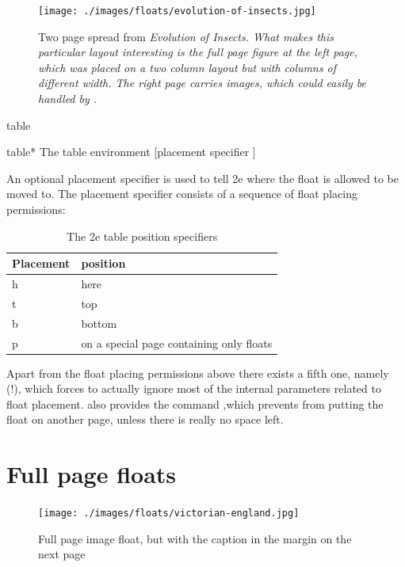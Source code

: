 \begin{figure}[hb]
\texttt{[image: ./images/floats/evolution-of-insects.jpg]}
\caption{Two page spread from \textit{Evolution of Insects. What makes this particular layout interesting is the full page figure at the left page, which was placed on a two column layout but with columns of different width. The right page carries images, which could easily be handled by \latexe.   }}
\end{figure}

\begin{environment}{table}
\begin{environment}{table*}
 The table environment 
[placement specifier ]
\end{environment}
\end{environment}

An optional placement specifier is used to tell \latex2e where the float is allowed to be
moved to. The placement specifier consists of a sequence of float placing permissions:

\begin{table}[htbp]
\centering
\begin{tabular}{lp{3.5cm}}
\toprule
Placement   & position\\
\midrule
h                 & here\\
t                  & top\\
b                 & bottom\\
p                 & on a special page containing only floats\\
\bottomrule
\end{tabular}

\caption{The \latex2e table position specifiers}
\end{table}




Apart from the float placing permissions above there exists a fifth one, namely (!), which
forces \latex to actually ignore most of the internal parameters related to float placement.
\latex also provides the command ,which prevents \latex from putting the float on another page, unless there is really no space left.


\section{Full page floats}

\begin{figure}[hbt]
\texttt{[image: ./images/floats/victorian-england.jpg]}
\caption{Full page image float, but with the caption in the margin on the next page}
\label{fig:victorian}
\end{figure}

